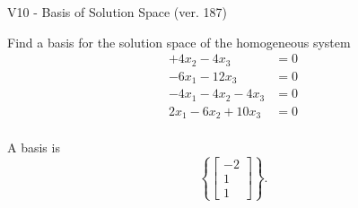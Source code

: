 \begin{exercise}
  \begin{exerciseTitle}V10 - Basis of Solution Space (ver. 187)\end{exerciseTitle}
  \begin{exerciseStatement}
    Find a basis for the solution space of the homogeneous system 
\begin{align*}
 + 4 x_ 2 -4 x_ 3 &= 0  \\ 
  -6 x_ 1 -12 x_ 3 &= 0  \\ 
  -4 x_ 1 -4 x_ 2 -4 x_ 3 &= 0  \\ 
  2 x_ 1 -6 x_ 2 + 10 x_ 3 &= 0  \\ 
 \end{align*}


 
  \end{exerciseStatement}

  \begin{exerciseAnswer}
   A basis is   
\[\left\{\left[\begin{array}{c}
-2 \\
1 \\
1
\end{array}\right]\right\}.\]

  


  \end{exerciseAnswer}
\end{exercise}